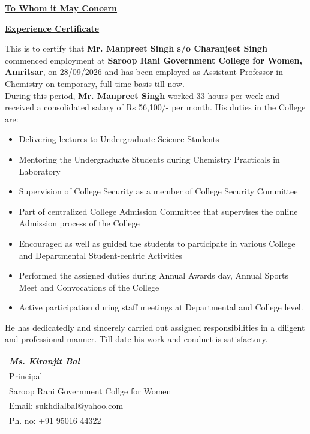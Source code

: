 \documentclass[12pt]{article}
\begin{document}
	\onehalfspacing
		\begin{center}
			\underline{\textbf{To Whom it May Concern}}
		\end{center}
	
	\vspace{0.8cm}

		\begin{center}
			\underline{\textbf{Experience Certificate}}
		\end{center}	
	\vspace{1cm}
	This is to certify that \textbf{Mr. Manpreet Singh s/o Charanjeet Singh} commenced employment at \textbf{Saroop Rani Government College for Women, Amritsar}, on 28/09/2026 and has been employed as Assistant Professor in Chemistry on temporary, full time basis till now. \\
	During this period, \textbf{Mr. Manpreet Singh} worked 33 hours per week and received a consolidated salary of Rs 56,100/- per month. His duties in the College are:
	\begin{itemize}
		\item Delivering lectures to Undergraduate Science Students
		\item Mentoring the Undergraduate Students during Chemistry Practicals in Laboratory 
		\item Supervision of College Security as a member of College Security Committee
		\item Part of centralized College Admission Committee that supervises the online Admission process of the College
		\item Encouraged as well as guided the students to participate in various College and Departmental Student-centric Activities 
		\item Performed the assigned duties during Annual Awards day, Annual Sports Meet and Convocations of the College
		\item Active participation during staff meetings at Departmental and College level. 
	\end{itemize}
	\vspace{0.1cm}
	He has dedicatedly and sincerely carried out assigned responsibilities in a diligent and professional manner. Till date his work and conduct is satisfactory.
	\vspace{3cm}
	
	
		
	\noindent
	\hfill
		\begin{tabular}{l @{}}
			\textit{\textbf{Ms. Kiranjit Bal}} \\
			Principal \\
			Saroop Rani Government Collge for Women \\
			Email: sukhdialbal@yahoo.com \\
			Ph. no: +91 95016 44322 \\
		\end{tabular}
	\vspace{2cm}
	
\end{document}
